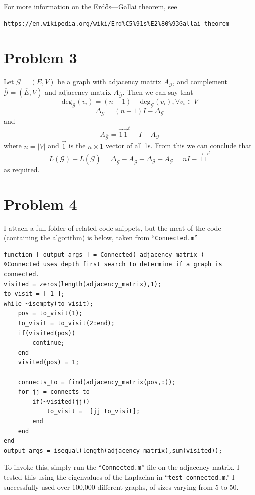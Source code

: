 \documentclass{article}
\begin{document}
For more information on the Erd\H{o}s--–Gallai theorem, see 
\begin{verbatim}
https://en.wikipedia.org/wiki/Erd%C5%91s%E2%80%93Gallai_theorem
\end{verbatim}


\section*{Problem 3}
Let $\mathcal{G} = (E,V)$ be a graph with adjacency matrix $A_{\mathcal{G}}$,
and complement $\overline{\mathcal{G}} = (\overline{E}, V)$ and adjacency matrix
$A_{\overline{\mathcal{G}}}$. Then we can say that 
\[ \text{deg}_{\overline{\mathcal{G}}}(v_i) = (n-1) -
\text{deg}_{\mathcal{G}}(v_i), \forall v_i \in V \]
\[ \Delta_{\overline{\mathcal{G}}} = (n-1)I -
\Delta_{\mathcal{G}} \]
and
\[ A_{\overline{\mathcal{G}}} = \vec{1}\vec{1}^t - I - A_{\mathcal{G}} \]
where $n = |V|$ and $\vec{1}$ is the $n\times 1$ vector of all 1s. From this we
can conclude that
\[ L(\mathcal{G}) + L(\overline{\mathcal{G}}) = \Delta_{\mathcal{\overline{G}}} -
A_{\mathcal{\overline{G}}} + \Delta_{\mathcal{G}} - A_{\mathcal{G}} = nI - \vec{1}\vec{1}^t
\]
as required.

\section*{Problem 4}
I attach a full folder of related code snippets, but the meat of the code
(containing the algorithm) is below, taken from ``\texttt{Connected.m}''
\begin{verbatim}
function [ output_args ] = Connected( adjacency_matrix )
%Connected uses depth first search to determine if a graph is connected.
visited = zeros(length(adjacency_matrix),1);
to_visit = [ 1 ];
while ~isempty(to_visit);
    pos = to_visit(1);
    to_visit = to_visit(2:end);
    if(visited(pos))
        continue;
    end
    visited(pos) = 1;
    
    connects_to = find(adjacency_matrix(pos,:));
    for jj = connects_to
        if(~visited(jj))
            to_visit =  [jj to_visit];
        end
    end
end
output_args = isequal(length(adjacency_matrix),sum(visited));
\end{verbatim}
To invoke this, simply run the ``\texttt{Connected.m}'' file on the adjacency matrix. I
tested this using the eigenvalues of the Laplacian in
``\texttt{test\_connected.m}.'' I successfully used over 100,000 different graphs, of sizes
varying from 5 to 50.
\end{document}
